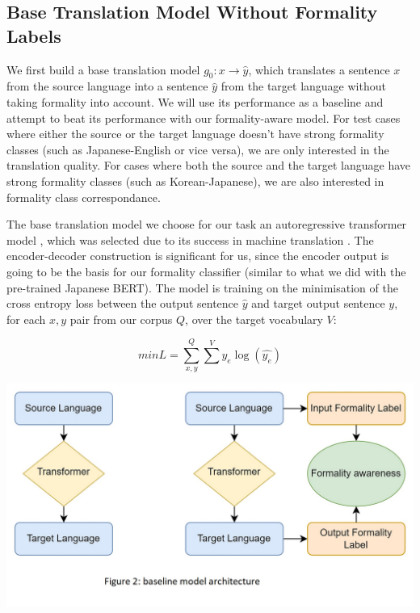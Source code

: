 \documentclass[11pt]{article}
\begin{document}
\subsection{Base Translation Model Without Formality Labels}

We first build a base translation model $g_0: x \rightarrow \hat{y}$, which translates a sentence $x$ from the source language into a sentence $\hat{y}$ from the target language without taking formality into account. We will use its performance as a baseline and attempt to beat its performance with our formality-aware model. For test cases where either the source or the target language doesn't have strong formality classes (such as Japanese-English or vice versa), we are only interested in the translation quality. For cases where both the source and the target language have strong formality classes (such as Korean-Japanese), we are also interested in formality class correspondance.

The base translation model we choose for our task an autoregressive transformer model \cite{vaswani2017attention}, which was selected due to its success in machine translation \cite{liu2020deep}. The encoder-decoder construction is significant for us, since the encoder output is going to be the basis for our formality classifier (similar to what we did with the pre-trained Japanese BERT). The model is training on the minimisation of the cross entropy loss between the output sentence $\hat{y}$ and target output sentence $y$, for each $x, y$ pair from our corpus $Q$, over the target vocabulary $V$:

\begin{equation}
    min{L} = \sum_{x, y}^Q{\sum^{V}{y_e \log{(\hat{y_e})}}}
\end{equation}

\includegraphics{images/baseline.jpg}
\end{document}
